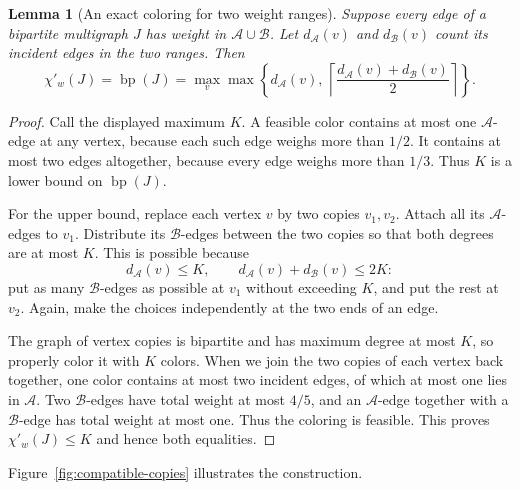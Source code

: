 \documentclass[11pt]{article}
\newtheorem{lemma}[theorem]{Lemma}
\theoremstyle{definition}\newtheorem{algorithm}{Algorithm}[section]
\numberwithin{equation}{section}
\theoremstyle{remark}\newtheorem*{remark}{Remark}
\newcommand{\bp}{\operatorname{bp}}
\begin{document}
\begin{lemma}[An exact coloring for two weight ranges]\label{lem:compatible-ranges}
Suppose every edge of a bipartite multigraph $J$ has weight in
$\mathcal A\cup\mathcal B$. Let $d_{\mathcal A}(v)$ and
$d_{\mathcal B}(v)$ count its incident edges in the two ranges. Then
\[
 \chi'_w(J)=\bp(J)=
 \max_v\max\left\{
   d_{\mathcal A}(v),\,
   \left\lceil\frac{d_{\mathcal A}(v)+d_{\mathcal B}(v)}2\right\rceil
 \right\}.
\]
\end{lemma}
\begin{proof}
Call the displayed maximum $K$. A feasible color contains at most one
$\mathcal A$-edge at any vertex, because each such edge weighs more than
$1/2$. It contains at most two edges altogether, because every edge
weighs more than $1/3$. Thus $K$ is a lower bound on $\bp(J)$.

For the upper bound, replace each vertex $v$ by two copies $v_1,v_2$.
Attach all its $\mathcal A$-edges to $v_1$. Distribute its
$\mathcal B$-edges between the two copies so that both degrees are at
most $K$. This is possible because
\[
 d_{\mathcal A}(v)\le K,\qquad
 d_{\mathcal A}(v)+d_{\mathcal B}(v)\le2K:
\]
put as many $\mathcal B$-edges as possible at $v_1$ without exceeding
$K$, and put the rest at $v_2$. Again, make the choices independently at
the two ends of an edge.

The graph of vertex copies is bipartite and has maximum degree at most
$K$, so properly color it with $K$ colors. When we join the two copies
of each vertex back together, one color contains at most two incident
edges, of which at most one lies in $\mathcal A$. Two
$\mathcal B$-edges have total weight at most $4/5$, and an
$\mathcal A$-edge together with a $\mathcal B$-edge has total weight
at most one. Thus the coloring is feasible. This proves
$\chi'_w(J)\le K$ and hence both equalities.
\end{proof}

Figure~\ref{fig:compatible-copies} illustrates the construction.
\end{document}
